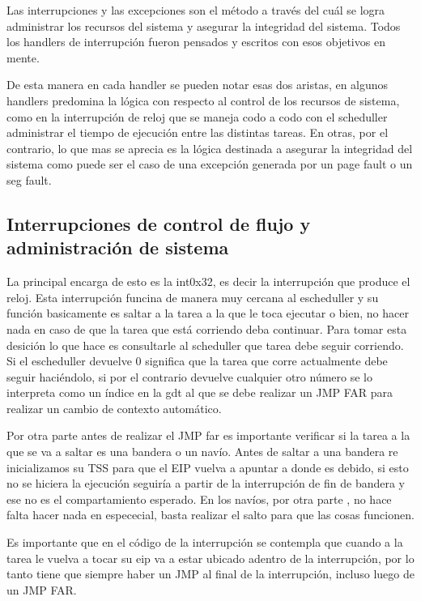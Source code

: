 	Las interrupciones y las excepciones son el método
a través del cuál se logra administrar los recursos del sistema y asegurar
la integridad del sistema. Todos los handlers de interrupción fueron
pensados y escritos con esos objetivos en mente.

	De esta manera en cada handler se pueden notar esas dos aristas,
en algunos handlers predomina la lógica con respecto al control de los
recursos de sistema, como en la interrupción de reloj que se maneja codo
a codo con el scheduller administrar el tiempo de ejecución entre
las distintas tareas. En otras, por el contrario, lo que mas se aprecia
es la lógica destinada a asegurar la integridad del sistema como puede
ser el caso de una excepción generada por un page fault o un seg fault.

\subsection{Interrupciones de control de flujo y administración de sistema}

	
	La principal encarga de esto es la int0x32, es decir la interrupción
que produce el reloj. Esta interrupción funcina de manera muy cercana al escheduller
y su función basicamente es saltar a la tarea a la que le toca ejecutar o
bien, no hacer nada en caso de que la tarea que está corriendo deba continuar.
Para tomar esta desición lo que hace es consultarle al scheduller que tarea
debe seguir corriendo. Si el escheduller devuelve 0 significa que la tarea
que corre actualmente debe seguir haciéndolo, si por el contrario
devuelve cualquier otro número se lo interpreta como un índice en
la gdt al que se debe realizar un JMP FAR para realizar un cambio
de contexto automático.

	Por otra parte antes de realizar el JMP far es importante
verificar si la tarea a la que se va a saltar es una bandera o un
navío. Antes de saltar a una bandera re inicializamos su TSS para
que el EIP vuelva a apuntar a donde es debido, si esto no se hiciera
la ejecución seguiría a partir de la interrupción de fin de bandera
y ese no es el compartamiento esperado. En los navíos, por otra parte
, no hace falta hacer nada en espececial, basta realizar el salto
para que las cosas funcionen.

	Es importante que en el código de la interrupción se contempla
que cuando a la tarea le vuelva a tocar su eip va a estar ubicado adentro
de la interrupción, por lo tanto tiene que siempre haber un JMP al
final de la interrupción, incluso luego de un JMP FAR.
	
